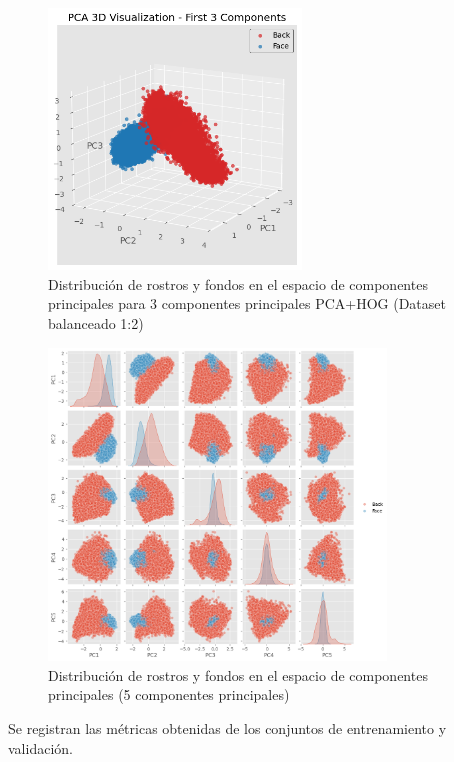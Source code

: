 \documentclass{article}
\begin{document}
\begin{figure}[H]
    \centering
    \includegraphics[width=0.6\textwidth]{tarea_4/imagenes/pca_classes_x1_v1_20_3_components.png}
    \caption{Distribución de rostros y fondos en el espacio de componentes principales para 3 componentes principales PCA+HOG (Dataset balanceado 1:2)}
    \label{fig:pca_classes}
\end{figure}

\begin{figure}[H]
    \centering
    \includegraphics[width=0.8\textwidth]{tarea_4/imagenes/pairplot_x2_v1_20.png}
    \caption{Distribución de rostros y fondos en el espacio de componentes principales (5 componentes principales)}
    \label{fig:pca_classes}
\end{figure}

Se registran las métricas obtenidas de los conjuntos de entrenamiento y validación.
\end{document}
